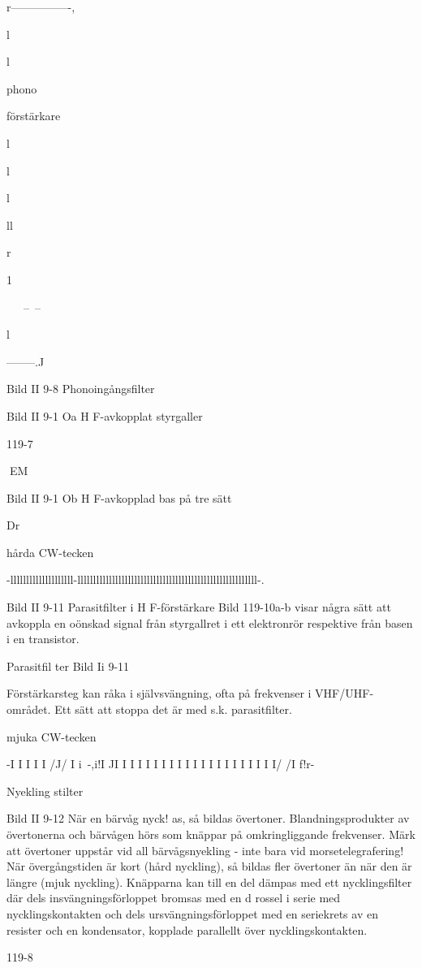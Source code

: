 \documentclass[a4paper,twoside,twocolumn,openright]{book}
\begin{document}
{{{{{r----------------,

l

l

phono

förstärkare

l

l

l

ll

r

1

~~~--~--~~~

l

--------.J

Bild II 9-8 Phonoingångsfilter

Bild II 9-1 Oa H F-avkopplat styrgaller

119-7

EM

Bild II 9-1 Ob H F-avkopplad bas på tre sätt

Dr

hårda CW-tecken

-llllllllllllllllllll-lllllllllllllllllllllllllllllllllllllllllllllllllllllllll-.

Bild II 9-11 Parasitfilter i H F-förstärkare
Bild 119-10a-b visar några sätt att avkoppla
en oönskad signal från styrgallret i ett elektronrör respektive från basen i en transistor.

Parasitfil ter
Bild Ii 9-11

Förstärkarsteg kan råka i självsvängning,
ofta på frekvenser i VHF/UHF-området. Ett
sätt att stoppa det är med s.k. parasitfilter.

mjuka CW-tecken

-I I I I I /J/ I i~-,i!I JI I I I I I I I I I I I I I I I I I I I I/ /I f!r-

Nyekling stilter

Bild II 9-12
När en bärvåg nyck! as, så bildas övertoner.
Blandningsprodukter av övertonerna och
bärvågen hörs som knäppar på omkringliggande frekvenser. Märk att övertoner uppstår vid all bärvågsnyekling - inte bara vid
morsetelegrafering!
När övergångstiden är kort (hård nyckling), så bildas fler övertoner än när den är
längre (mjuk nyckling). Knäpparna kan till en
del dämpas med ett nycklingsfilter där dels
insvängningsförloppet bromsas med en d rossel i serie med nycklingskontakten och dels
ursvängningsförloppet med en seriekrets av
en resister och en kondensator, kopplade
parallellt över nycklingskontakten.

119-8

}}}}}
\end{document}
